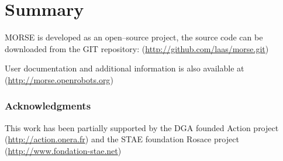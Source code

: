 \documentclass{llncs}
\begin{document}
\section{Summary}
\label{section:discussion}


MORSE is developed as an open--source project, the source code can be
downloaded from the GIT repository:
(\url{http://github.com/laas/morse.git})

User documentation and additional information is also available at
(\url{http://morse.openrobots.org})


\subsubsection*{Acknowledgments}
This work has been partially supported by the DGA founded Action project
(\url{http://action.onera.fr}) and the STAE foundation Rosace project
(\url{http://www.fondation-stae.net})



\end{document}
